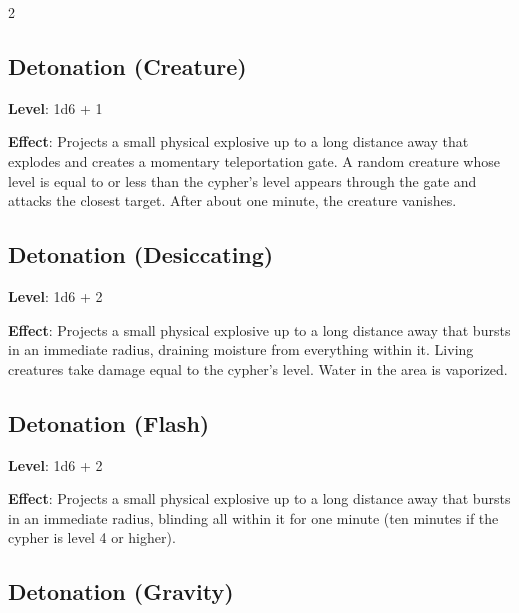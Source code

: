 \begin{multicols}{2}

\subsection{Detonation (Creature)}

\textbf{Level}: 1d6 + 1

\textbf{Effect}: Projects a small physical explosive up to a long distance away that explodes and creates a momentary teleportation gate. A random creature whose level is equal to or less than the cypher’s level appears through the gate and attacks the closest target. After about one minute, the creature vanishes.

\subsection{Detonation (Desiccating)}

\textbf{Level}: 1d6 + 2

\textbf{Effect}: Projects a small physical explosive up to a long distance away that bursts in an immediate radius, draining moisture from everything within it. Living creatures take damage equal to the cypher’s level. Water in the area is vaporized.

\subsection{Detonation (Flash)}

\textbf{Level}: 1d6 + 2

\textbf{Effect}: Projects a small physical explosive up to a long distance away that bursts in an immediate radius, blinding all within it for one minute (ten minutes if the cypher is level 4 or higher).

\subsection{Detonation (Gravity)}


\end{multicols}
